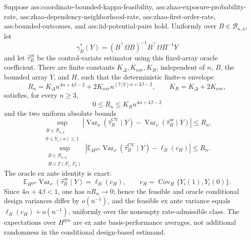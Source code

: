 Suppose ass:coordinate-bounded-kappa-feasibility, ass:zhao-exposure-probability-rate, ass:zhao-dependency-neighborhood-rate, ass:zhao-first-order-rate, ass:bounded-outcomes, and ass:iid-potential-pairs hold.  Uniformly over \(B\in\mathcal B_{\kappa,\overline a}\), let
\[
\gamma_B^*(Y)=(B^{\top}\Omega B)^{-1}B^{\top}\Omega\Pi^{-1}Y
\]
and let \(\widehat\tau_B^{\mathrm{or}}\) be the control-variate estimator using this fixed-array oracle coefficient.  There are finite constants \(K_\Delta,K_{\mathrm{cov}},K_R\), independent of \(n\), \(B\), the bounded array \(Y\), and \(H\), such that the deterministic finite-\(n\) envelope
\[
R_n=K_\Delta n^{4\alpha+4\beta-2}
+2K_{\mathrm{cov}}n^{(7/2)\alpha+3\beta-2},
\qquad K_R=K_\Delta+2K_{\mathrm{cov}},
\]
satisfies, for every \(n\ge3\),
\[
0\le R_n\le K_Rn^{4\alpha+4\beta-2}
\]
and the two uniform absolute bounds
\[
\sup_{\substack{B\in\mathcal B_{\kappa,\overline a}\\0\le Y_i(a)\le1}}
\left|
\operatorname{Var}_\nu(\widehat\tau_B^{\mathrm{CV}}\mid Y)
-\operatorname{Var}_\nu(\widehat\tau_B^{\mathrm{or}}\mid Y)
\right|
\le R_n,
\]
\[
\sup_{\substack{B\in\mathcal B_{\kappa,\overline a}\\H\in\Gamma(F_1,F_0)}}
\left|
\mathbb E_{H^{\otimes n}}
\operatorname{Var}_\nu(\widehat\tau_B^{\mathrm{CV}}\mid Y)
-\ell_B(c_H)
\right|
\le R_n.
\]
The oracle ex ante identity is exact:
\[
\mathbb E_{H^{\otimes n}}
\operatorname{Var}_\nu(\widehat\tau_B^{\mathrm{or}}\mid Y)
=\ell_B(c_H),
\qquad
c_H=\operatorname{Cov}_H\{Y_i(1),Y_i(0)\}.
\]
Since \(4\alpha+4\beta<1\), one has \(nR_n\to0\); hence the feasible and oracle conditional design variances differ by \(o(n^{-1})\), and the feasible ex ante variance equals \(\ell_B(c_H)+o(n^{-1})\), uniformly over the nonempty rate-admissible class.  The expectations over \(H^{\otimes n}\) are ex ante basis-performance averages, not additional randomness in the conditional design-based estimand.
